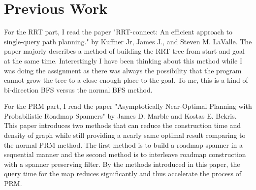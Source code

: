 \documentclass{article}
\begin{document}
\clearpage
\section{Previous Work}
For the RRT part, I read the paper "RRT-connect: An efficient approach to single-query path planning." by Kuffner Jr, James J., and Steven M. LaValle. The paper majorly describes a method of building the RRT tree from start and goal at the same time. Interestingly I have been thinking about this method while I was doing the assignment as there was always the possibility that the program cannot grow the tree to a close enough place to the goal. To me, this is a kind of bi-direction BFS versus the normal BFS method.


For the PRM part, I read the paper "Asymptotically Near-Optimal Planning with Probabilistic Roadmap Spanners" by James D. Marble and Kostas E. Bekris. This paper introduces two methods that can reduce the construction time and density of graph while still providing a nearly same optimal result comparing to the normal PRM method. The first method is to build a roadmap spanner in a sequential manner and the second method is to interleave roadmap construction with a spanner preserving filter. By the methods introduced in this paper, the query time for the map reduces significantly and thus accelerate the process of PRM.
\end{document}
